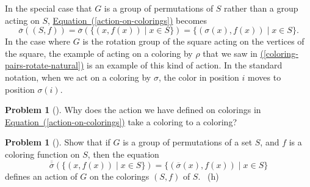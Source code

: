 \documentclass[10pt,]{book}
\theoremstyle{plain}
\theoremstyle{definition}
\newtheorem{activity}[project]{Problem}
\theoremstyle{definition}
\numberwithin{equation}{chapter}
\begin{document}
\par
\hypertarget{p-1622}{}%
In the special case that \(G\) is a group of permutations of \(S\) rather than a group acting on \(S\), \hyperref[action-on-colorings]{Equation~(\ref{action-on-colorings})} becomes%
\begin{equation*}
\overline{\sigma}((S,f)) = \overline{\sigma}(\{(x,f(x))\mid x\in S\}) = \{(\sigma(x),f(x))\mid x\in S\}\text{.}
\end{equation*}
In the case where \(G\) is the rotation group of the square acting on the vertices of the square, the example of acting on a coloring by \(\rho\) that we saw in \hyperref[coloring-pairs-rotate-natural]{(\ref{coloring-pairs-rotate-natural})} is an example of this kind of action. In the standard notation, when we act on a coloring by \(\sigma\), the color in position \(i\) moves to position \(\sigma(i)\).%
\begin{activity}[]\marginsymbol[-1em]{} \label{coloring-to-coloring}
\hypertarget{p-1623}{}%
Why does the action we have defined on colorings in \hyperref[action-on-colorings]{Equation~(\ref{action-on-colorings})} take a coloring to a coloring?%
\end{activity}
\begin{activity}[]\marginsymbol[-1em]{} \label{activity-286}
\hypertarget{p-1625}{}%
Show that if \(G\) is a group of permutations of a set \(S\), and \(f\) is a coloring function on \(S\), then the equation%
\begin{equation*}
\overline{\overline{\sigma}}(\{(x,f(x))\mid x\in S\}) = \{(\overline{\sigma}(x),f(x))\mid x\in S\}
\end{equation*}
defines an action of \(G\) on the colorings \((S,f)\) of \(S\).%
~{\tiny (h)}\end{activity}
\typeout{************************************************}
\typeout{************************************************}
\end{document}
